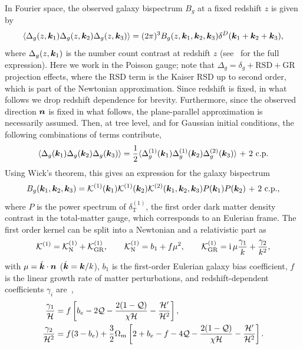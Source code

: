 In Fourier space, the observed galaxy bispectrum \(B_g\) at a fixed redshift \(z\) is given by~\cite{Jolicoeur:2017nyt,Jolicoeur:2017eyi}
\begin{equation}
	\langle \Delta_g(z,\bm {k}_1) \Delta_g(z,\bm {k}_2) \Delta_g(z,\bm {k}_3) \rangle = (2\pi)^3 B_g(z,\bm {k}_1,\bm {k}_2,\bm {k}_3) \delta^D(\bm {k}_1+\bm {k}_2+\bm {k}_3),
\end{equation}
where \(\Delta_g(z, \bm {k}_1)\) is the number count contrast at redshift \(z\) (see~\cite{Jolicoeur:2017nyt} for the full expression). Here we work in the Poisson gauge; note that \(\Delta_g = \delta_g + \text{RSD}+\text{GR}\) projection effects, where the RSD term is the Kaiser RSD up to second order, which is part of the Newtonian approximation. Since redshift is fixed, in what follows we drop redshift dependence for brevity. Furthermore, since the observed direction \(\bm {n}\) is fixed in what follows, the plane-parallel approximation is necessarily assumed. Then, at tree level, and for Gaussian initial conditions, the following combinations of terms contribute, 
\begin{equation}
\langle \Delta_g(\bm {k}_1)\Delta_g(\bm {k}_2)\Delta_g(\bm {k}_3) \rangle = \frac{1}{2} \langle \Delta_g^{(1)}(\bm {k}_1)\Delta_g^{(1)}(\bm {k}_2)\Delta_g^{(2)}(\bm {k}_3)\rangle \text{ + 2 c.p.}
\end{equation}
Using Wick's theorem, this gives an expression for the galaxy bispectrum ~\cite{Jolicoeur:2017nyt}
\begin{equation}
B_g(\bm {k}_1, \bm {k}_2,\bm {k}_3)= \mathcal{K}^{(1)}(\bm {k}_1) \mathcal{K}^{(1)}(\bm {k}_2) \mathcal{K}^{(2)}(\bm {k}_1,\bm {k}_2,\bm {k}_3)P(\bm {k}_1) P(\bm {k}_2)\text{ + 2 c.p.},
\end{equation}
where \(P\) is the power spectrum of \(\delta_\mathrm{T}^{(1)}\), the first order dark matter density contrast in the total-matter gauge, which corresponds to an Eulerian frame. The first order kernel can be split into a Newtonian and a relativistic part as~\cite{Jeong:2011as}
\begin{equation}
\mathcal{K}^{(1)} = \mathcal{K}^{(1)}_\mathrm{N} + \mathcal{K}^{(1)}_\mathrm{GR}, \qquad \mathcal{K}^{(1)}_\mathrm{N}= b_1 + f \mu^2, \qquad \mathcal{K}^{(1)}_\mathrm{GR} = \mathrm{i\,} \mu \frac{\gamma_1}{k} + \frac{\gamma_2}{k^2}, 
\end{equation}
with \(\mu = \hat{\bm {k}} \cdot \bm {n} \) (\(\hat{\bm {k}} = \bm {k}/k\)), \(b_1\) is the first-order Eulerian galaxy bias coefficient, \(f\) is the linear growth rate of matter perturbations, and redshift-dependent coefficients \(\gamma_i\) are~\cite{Jeong:2011as},
\begin{align}\label{eq:gamma1def}
\frac{\gamma_1}{\mathcal{H}} &= f \left[ b_e - 2 \mathcal{Q} - \frac{2(1-\mathcal{Q})}{\chi \mathcal{H}} - \frac{\mathcal{H}'}{\mathcal{H}^2}\right], \\
\frac{\gamma_2}{\mathcal{H}^2} &= f(3-b_e) + \frac{3}{2} \Omega_m \left[ 2+ b_e - f - 4\mathcal{Q} - \frac{2(1-\mathcal{Q})}{\chi\mathcal{H}} - \frac{\mathcal{H}'}{\mathcal{H}^2} \right].\label{eq:gamma2def}
\end{align}
